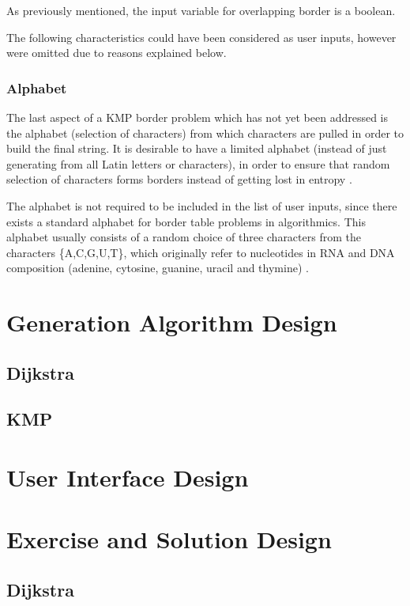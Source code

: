 \documentclass{l4proj}
\begin{document}
As previously mentioned, the input variable for overlapping border is a boolean.

The following characteristics could have been considered as user inputs, however were omitted due to reasons explained below.

\subsubsection{Alphabet}

The last aspect of a KMP border problem which has not yet been addressed is the alphabet (selection of characters) from which characters are pulled in order to build the final string. It is desirable to have a limited alphabet (instead of just generating from all Latin letters or characters), in order to ensure that random selection of characters forms borders instead of getting lost in entropy \cite{a}.
 
The alphabet is not required to be included in the list of user inputs, since there exists a standard alphabet for border table problems in algorithmics. This alphabet usually consists of a random choice of three characters from the characters \{A,C,G,U,T\}, which originally refer to nucleotides in RNA and DNA composition (adenine, cytosine, guanine, uracil and thymine) \cite{a}.

\section{Generation Algorithm Design}

\subsection{Dijkstra}
\label{sec:dgen}
\subsection{KMP}

\section{User Interface Design}

\section{Exercise and Solution Design}

\subsection{Dijkstra}
\end{document}
